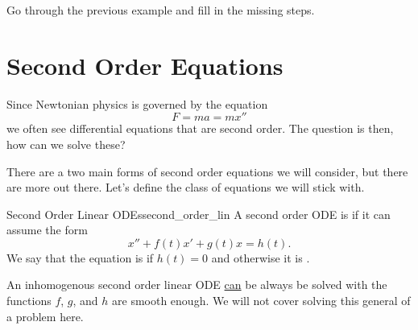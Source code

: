         \begin{exercise}
        Go through the previous example and fill in the missing steps.
        \end{exercise}
        
        \section{Second Order Equations}
        
        Since Newtonian physics is governed by the equation
        \[
        F=ma=mx''
        \]
        we often see differential equations that are second order.  The question is then, how can we solve these?  
        
        There are a two main forms of second order equations we will consider, but there are more out there. Let's define the class of equations we will stick with.
        
        \begin{df}{Second Order Linear ODEs}{second_order_lin}
            A second order ODE is  if it can assume the form 
            \[
            x''+f(t)x'+g(t)x=h(t).
            \]
            We say that the equation is  if $h(t)=0$ and otherwise it is .
        \end{df}
        
        \begin{remark}
        An inhomogenous second order linear ODE \underline{can} be always be solved with the functions $f$, $g$, and $h$ are smooth enough.  We will not cover solving this general of a problem here.
        \end{remark}
        
